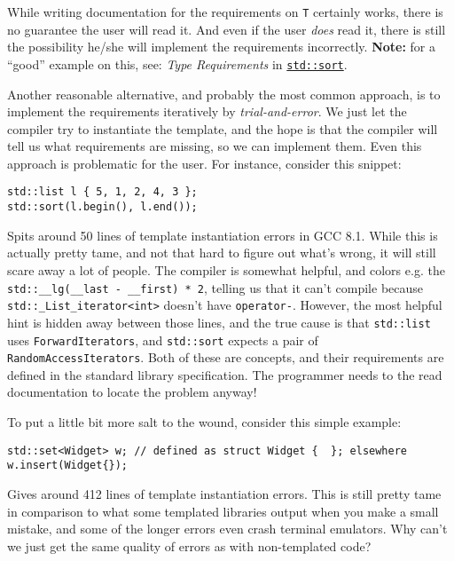     

    While writing documentation for the requirements on \texttt{T} certainly works, there is no guarantee the user will read it. And even if the user \emph{does} read it, there is still the possibility he/she will implement the requirements incorrectly. \textbf{Note:} for a ``good'' example on this, see: \emph{Type Requirements} in \href{https://en.cppreference.com/w/cpp/algorithm/sort}{\texttt{std::sort}}.

    Another reasonable alternative, and probably the most common approach, is to implement the requirements iteratively by \emph{trial-and-error}. We just let the compiler try to instantiate the template, and the hope is that the compiler will tell us what requirements are missing, so we can implement them. Even this approach is problematic for the user. For instance, consider this snippet:

    \begin{lstlisting}
std::list l { 5, 1, 2, 4, 3 };
std::sort(l.begin(), l.end()); \end{lstlisting}

\noindent Spits around 50 lines of template instantiation errors in GCC 8.1. While this is actually pretty tame, and not that hard to figure out what's wrong, it will still scare away a lot of people. The compiler is somewhat helpful, and colors e.g. the \texttt{std::\_\_lg(\_\_last - \_\_first) * 2}, telling us that it can't compile because \texttt{std::\_List\_iterator<int>} doesn't have \texttt{operator-}. However, the most helpful hint is hidden away between those lines, and the true cause is that \texttt{std::list} uses \texttt{ForwardIterators}, and \texttt{std::sort} expects a pair of \texttt{RandomAccessIterators}. Both of these are concepts, and their requirements are defined in the standard library specification. The programmer needs to the read documentation to locate the problem anyway!

To put a little bit more salt to the wound, consider this simple example:

    \begin{lstlisting}
std::set<Widget> w; // defined as struct Widget {  }; elsewhere
w.insert(Widget{}); \end{lstlisting}

\noindent Gives around 412 lines of template instantiation errors. This is still pretty tame in comparison to what some templated libraries output when you make a small mistake, and some of the longer errors even crash terminal emulators. Why can't we just get the same quality of errors as with non-templated code?

